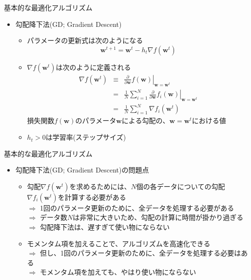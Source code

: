 \documentclass[dvipdfmx,notheorems,t]{beamer}
\begin{document}
\begin{frame}{基本的な最適化アルゴリズム}

\begin{itemize}
	\item 勾配降下法(GD; Gradient Descent)
	\begin{itemize}
		\item パラメータの更新式は次のようになる
		\begin{equation}
			\bm{w}^{t + 1} = \bm{w}^t - h_t \nabla f(\bm{w}^t)
		\end{equation}
		
		\item $\nabla f(\bm{w}^t)$は次のように定義される
		\begin{eqnarray}
			\nabla f(\bm{w}^t) &\equiv& \left. \frac{\partial}{\partial \bm{w}} f(\bm{w}) \right|_{\bm{w} = \bm{w}^t} \\
			&=& \frac{1}{N} \sum_{i = 1}^N \left. \frac{\partial}{\partial \bm{w}} f_i(\bm{w}) \right|_{\bm{w} = \bm{w}^t} \\
			&=& \frac{1}{N} \sum_{i = 1}^N \nabla f_i(\bm{w}^t)
		\end{eqnarray}
		損失関数$f(\bm{w})$のパラメータ$\bm{w}$による勾配の、$\bm{w} = \bm{w}^t$における値
		
		\item $h_t > 0$は学習率(ステップサイズ)
	\end{itemize}
\end{itemize}

\end{frame}

\begin{frame}{基本的な最適化アルゴリズム}

\begin{itemize}
	\item 勾配降下法(GD; Gradient Descent)の問題点
	\begin{itemize}		
		\item 勾配$\nabla f(\bm{w}^t)$を求めるためには、$N$個の各データについての勾配$\nabla f_i(\bm{w}^t)$を計算する必要がある \\
		$\Rightarrow$ 1回のパラメータ更新のために、全データを処理する必要がある \\
		$\Rightarrow$ データ数$N$は非常に大きいため、勾配の計算に時間が掛かり過ぎる \newline \newline
		$\Rightarrow$ 勾配降下法は、遅すぎて使い物にならない
		\newline
		
		\item モメンタム項を加えることで、アルゴリズムを高速化できる \\
		$\Rightarrow$ 但し、1回のパラメータ更新のために、全データを処理する必要はある \\
		$\Rightarrow$ モメンタム項を加えても、やはり使い物にならない
	\end{itemize}
\end{itemize}

\end{frame}
\end{document}
